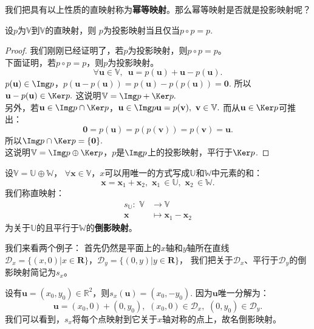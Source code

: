 \documentclass[12pt,UTF8,fontset=none]{ctexbook}
\begin{document}
我们把具有以上性质的直映射称为\textbf{幂等映射}。那么幂等映射是否就是投影映射呢？
\begin{pp}\label{pp:3_4}
    设$p$为$\mathbb{V}$到$\mathbb{V}$的直映射，则
    $p$为投影映射当且仅当$p\circ p = p.$
\end{pp}
\begin{proof} %
    我们刚刚已经证明了，若$p$为投影映射，则$p\circ p = p$。\\
    下面证明，若$p\circ p = p$，则$p$为投影映射。\\
    $$\forall \mathbf{u}\in\mathbb{V}, \,\,\, \mathbf{u} = p(\mathbf{u}) + \mathbf{u} - p(\mathbf{u}).$$
    $p(\mathbf{u})\in\Img p$，$p(\mathbf{u} - p(\mathbf{u})) = p(\mathbf{u}) - p(p(\mathbf{u})) = \mathbf{0}.$
    所以$\mathbf{u} - p(\mathbf{u})\in\Ker p.$
    这说明$\mathbb{V}=\Img p + \Ker p.$\\
    另外，若$\mathbf{u} \in \Img p \cap \Ker p$，$\mathbf{u} \in \Img p\mathbf{u} = p(\mathbf{v}), \,\,\mathbf{v}\in\mathbb{V}.$ 而从$\mathbf{u}\in\Ker p$可推出：
    $$ \mathbf{0} = p(\mathbf{u}) = p(p(\mathbf{v})) = p(\mathbf{v}) = \mathbf{u}.$$
    所以$\Img p \cap \Ker p = \{\mathbf{0}\}.$\\
    这说明$\mathbb{V}=\Img p \oplus \Ker p$，$p$是$\Img p$上的投影映射，平行于$\Ker p$.
\end{proof}


\begin{df}\label{df:3_2_1}
    设$\mathbb{V} = \mathbb{U} \oplus \mathbb{W}$，
    $\forall \mathbf{x}\in \mathbb{V}$，$x$可以用唯一的方式写成$\mathbb{U}$和$\mathbb{W}$中元素的和：
    $$ \mathbf{x} = \mathbf{x}_1 + \mathbf{x}_2, \,\,\mathbf{x}_1\,\in\mathbb{U},\,\,\mathbf{x}_2\,\in\mathbb{W}.$$
    我们称直映射：
    \begin{align*}
        s_{\mathbb{U}}: \,\, \mathbb{V} & \to \mathbb{V}  \\
        \mathbf{x} & \mapsto \mathbf{x}_1 - \mathbf{x}_2 
    \end{align*}    
    为关于$\mathbb{U}$的且平行于$\mathbb{W}$的\textbf{倒影映射}。
\end{df}

我们来看两个例子：
首先仍然是平面上的$x$轴和$y$轴所在直线
$\mathcal{D}_x = \{(x,0)|x\in\mathbf{R}\}$，$\mathcal{D}_y = \{(0,y)|y\in\mathbf{R}\}$，
我们把关于$\mathcal{D}_x$、平行于$\mathcal{D}_y$的倒影映射简记为$s_x$。

设有$\mathbf{u} = (x_0, y_0) \in\mathbb{R}^2$，则$s_x(\mathbf{u}) = (x_0,-y_0)$.
因为$\mathbf{u}$唯一分解为：
$$\mathbf{u} = (x_0,0) + (0,y_0), \,\,(x_0,0)\in\mathcal{D}_x,\,\,(0,y_0)\in\mathcal{D}_y.$$
我们可以看到，$s_x$将每个点映射到它关于$x$轴对称的点上，故名倒影映射。
\end{document}
